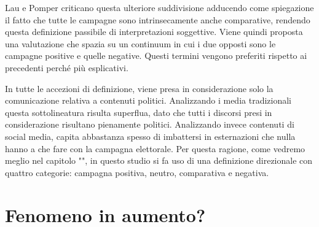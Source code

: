 Lau e Pomper \citep{lau2004} criticano questa ulteriore suddivisione adducendo come spiegazione il fatto che tutte le campagne sono intrinsecamente anche comparative, rendendo questa definizione passibile di interpretazioni soggettive. Viene quindi proposta  una valutazione che spazia su un continuum in cui i due opposti sono le campagne positive e quelle negative. Questi termini vengono preferiti rispetto ai precedenti perché più esplicativi.

In tutte le accezioni di definizione, viene presa in considerazione solo la comunicazione relativa a contenuti politici. Analizzando i media tradizionali questa sottolineatura risulta superflua, dato che tutti i discorsi presi in considerazione risultano pienamente politici. Analizzando invece contenuti di social media, capita abbastanza spesso di imbattersi in esternazioni che nulla hanno a che fare con la campagna elettorale. Per questa ragione, come vedremo meglio nel  capitolo "", in questo studio si fa uso di una definizione direzionale con quattro categorie: campagna positiva, neutro, comparativa e negativa.


\section{Fenomeno in aumento?}

